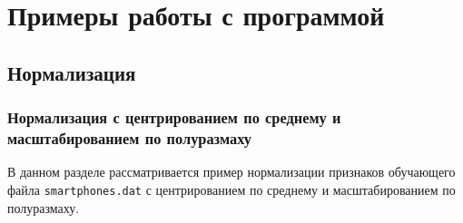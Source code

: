 \documentclass[12pt]{instruction}
\begin{document}
\section{Примеры работы с программой}
\subsection{Нормализация}
\subsubsection{Нормализация с центрированием по среднему и масштабированием по полуразмаху}
\label{subsubseq:example_norm1}

В данном разделе рассматривается пример нормализации признаков обучающего файла \texttt{smartphones.dat} с центрированием по среднему и масштабированием по полуразмаху. 
\end{document}
